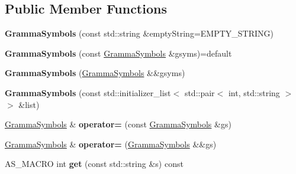 \subsection*{Public Member Functions}
\begin{DoxyCompactItemize}
\item 
\mbox{\label{classx2_1_1_gramma_symbols_a3c821b367628262c5c5f2a0dda4250b3}} 
{\bfseries Gramma\+Symbols} (const std\+::string \&empty\+String=E\+M\+P\+T\+Y\+\_\+\+S\+T\+R\+I\+NG)
\item 
\mbox{\label{classx2_1_1_gramma_symbols_ac90febd608ebef059fa29ea52a588518}} 
{\bfseries Gramma\+Symbols} (const \hyperlink{classx2_1_1_gramma_symbols}{Gramma\+Symbols} \&gsyms)=default
\item 
\mbox{\label{classx2_1_1_gramma_symbols_a891a249c01275bc3e1a31540b8a2d3b0}} 
{\bfseries Gramma\+Symbols} (\hyperlink{classx2_1_1_gramma_symbols}{Gramma\+Symbols} \&\&gsyms)
\item 
\mbox{\label{classx2_1_1_gramma_symbols_ae672047f559d8551d520d88622da7f63}} 
{\bfseries Gramma\+Symbols} (const std\+::initializer\+\_\+list$<$ std\+::pair$<$ int, std\+::string $>$ $>$ \&list)
\item 
\mbox{\label{classx2_1_1_gramma_symbols_ae71d1c101cc5ed0d981434c7060f5efd}} 
\hyperlink{classx2_1_1_gramma_symbols}{Gramma\+Symbols} \& {\bfseries operator=} (const \hyperlink{classx2_1_1_gramma_symbols}{Gramma\+Symbols} \&gs)
\item 
\mbox{\label{classx2_1_1_gramma_symbols_af7bae01689e15f9aa7ff509f2a736999}} 
\hyperlink{classx2_1_1_gramma_symbols}{Gramma\+Symbols} \& {\bfseries operator=} (\hyperlink{classx2_1_1_gramma_symbols}{Gramma\+Symbols} \&\&gs)
\item 
\mbox{\label{classx2_1_1_gramma_symbols_a4ab0bdb81b834729a6487c421d33ef30}} 
A\+S\+\_\+\+M\+A\+C\+RO int {\bfseries get} (const std\+::string \&s) const
\item 
\mbox{\label{classx2_1_1_gramma_symbols_a0d57500363cfa99756f71b04059fa806}} 

\end{DoxyCompactItemize}

